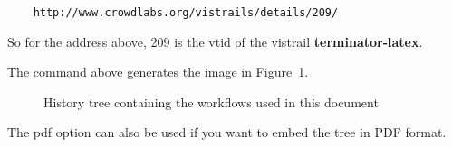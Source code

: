 \documentclass{article}
\begin{document}
\begin{verbatim}
    http://www.crowdlabs.org/vistrails/details/209/
\end{verbatim}

So for the address above, 209 is the \textsf{vtid} of the vistrail \textbf{terminator-latex}.

The command above generates the image in Figure~\ref{fig:tree}.
\begin{figure}[th]
\begin{center}
\end{center}
\vspace{-.5cm}
\caption{History tree containing the workflows used in this document}
\label{fig:tree}
\end{figure}

The \textsf{pdf} option can also be used if you want to embed the tree in PDF format.
\end{document}
